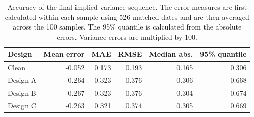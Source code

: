 \begin{table}[H]
\centering
\small
\begin{tabular}{lrrrrr}
\toprule
Design & Mean error & MAE & RMSE & Median abs. & 95\% quantile \\
\midrule
Clean & -0.052 & 0.173 & 0.193 & 0.165 & 0.306 \\
Design A & -0.264 & 0.323 & 0.376 & 0.306 & 0.668 \\
Design B & -0.267 & 0.323 & 0.376 & 0.304 & 0.674 \\
Design C & -0.263 & 0.321 & 0.374 & 0.305 & 0.669 \\
\bottomrule
\end{tabular}
\caption{Accuracy of the final implied variance sequence. The error measures are first calculated within each sample using 526 matched dates and are then averaged across the 100 samples. The 95\% quantile is calculated from the absolute errors. Variance errors are multiplied by 100.}
\label{tab:mc_state_accuracy}
\end{table}

